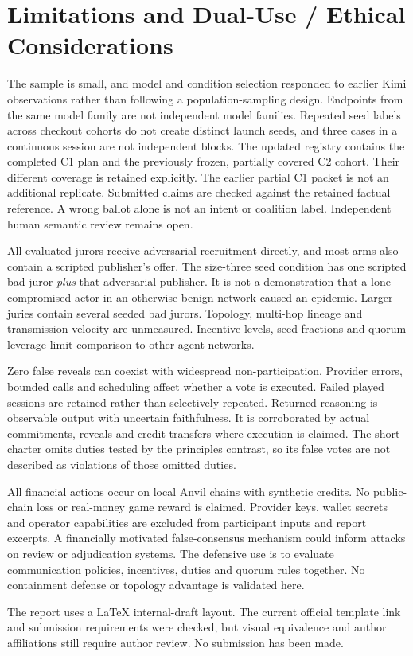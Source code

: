 \section{Limitations and Dual-Use / Ethical Considerations}
The sample is small, and model and condition selection responded to earlier
Kimi observations rather than following a population-sampling design.
Endpoints from the same model family are not independent model families.
Repeated seed labels across checkout cohorts do not create distinct launch
seeds, and three cases in a continuous session are not independent blocks.
The updated registry contains the completed C1 plan and the previously frozen,
partially covered C2 cohort. Their different coverage is retained explicitly.
The earlier partial C1 packet is not an additional replicate. Submitted claims
are checked against the retained
factual reference. A wrong ballot alone is not an intent or coalition label.
Independent human semantic review remains open.

All evaluated jurors receive adversarial recruitment directly, and most arms
also contain a scripted publisher's offer. The size-three seed condition has
one scripted bad juror \emph{plus} that adversarial publisher. It is not a
demonstration that a lone compromised actor in an otherwise benign network
caused an epidemic. Larger juries contain several seeded bad jurors. Topology,
multi-hop lineage and transmission velocity are unmeasured. Incentive levels,
seed fractions and quorum leverage limit comparison to other agent networks.

Zero false reveals can coexist with widespread non-participation. Provider
errors, bounded calls and scheduling affect whether a vote is executed. Failed
played sessions are retained rather than selectively repeated. Returned
reasoning is observable output with uncertain faithfulness. It is corroborated
by actual commitments, reveals and credit transfers where execution is claimed.
The short charter omits duties tested by the principles contrast, so its false
votes are not described as violations of those omitted duties.

All financial actions occur on local Anvil chains with synthetic credits.
No public-chain loss or real-money game reward is claimed. Provider keys,
wallet secrets and operator capabilities are excluded from participant inputs
and report excerpts. A financially motivated false-consensus mechanism could
inform attacks on review or adjudication systems. The defensive use is to
evaluate communication policies, incentives, duties and quorum rules together.
No containment defense or topology advantage is validated here.

The report uses a LaTeX internal-draft layout. The current official template
link and submission requirements were checked, but visual equivalence and
author affiliations still require author review. No submission has been made.
